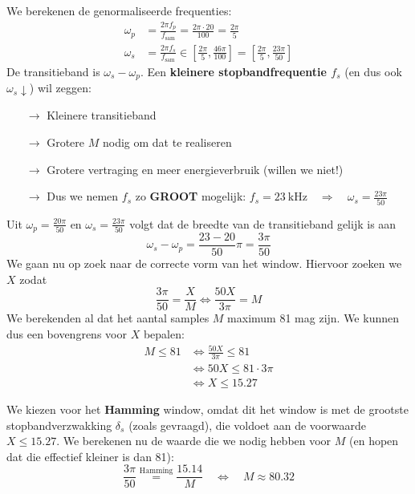 \documentclass[kulak]{kulakarticle}
\newcommand{\sam}{\text{sam}}
\begin{document}
	We berekenen de genormaliseerde frequenties:
	\begin{align*}
		\omega_p &= \frac{2\pi f_p}{f_\sam} = \frac{2\pi \cdot 20}{100} = \frac{2\pi}{5} \\
		\omega_s &= \frac{2\pi f_s}{f_\sam} \in \left[\frac{2\pi}{5},\frac{46\pi}{100}\right] = \left[\frac{2\pi}{5},\frac{23\pi}{50}\right]
	\end{align*}
	De transitieband is \(\omega_s-\omega_p\). Een \textbf{kleinere stopbandfrequentie \(f_s\)} (en dus ook \(\omega_s \downarrow\)) wil zeggen:
	\begin{itemize}
		\item[\(\rightarrow\)] Kleinere transitieband
		\item[\(\rightarrow\)] Grotere \(M\) nodig om dat te realiseren
		\item[\(\rightarrow\)] Grotere vertraging en meer energieverbruik (willen we niet!)
		\item[\(\rightarrow\)] Dus we nemen \(f_s\) zo \textbf{GROOT} mogelijk: \(f_s=\SI{23}{\kilo\hertz} \quad \Longrightarrow \quad \omega_s = \frac{23\pi}{50}\)
	\end{itemize}

	Uit \(\omega_p = \frac{20\pi}{50}\) en \(\omega_s = \frac{23\pi}{50}\) volgt dat de breedte van de transitieband gelijk is aan \[\omega_s-\omega_p=\frac{23-20}{50}\pi = \frac{3\pi}{50}\]	We gaan nu op zoek naar de correcte vorm van het window. Hiervoor zoeken we \(X\) zodat \[\frac{3\pi}{50}=\frac{X}{M} \Leftrightarrow \frac{50X}{3\pi}=M\] We berekenden al dat het aantal samples \(M\) maximum 81 mag zijn. We kunnen dus een bovengrens voor \(X\) bepalen:
	\begin{align*}
		M \leq 81 & \Leftrightarrow \frac{50X}{3\pi} \leq 81 \\
					& \Leftrightarrow 50X \leq 81 \cdot 3\pi \\
					& \Leftrightarrow X \leq 15.27
	\end{align*}

	We kiezen voor het \textbf{Hamming} window, omdat dit het window is met de grootste stopbandverzwakking \(\delta_s\) (zoals gevraagd), die voldoet aan de voorwaarde \(X \leq 15.27\). We berekenen nu de waarde die we nodig hebben voor \(M\) (en hopen dat die effectief kleiner is dan 81):
	\begin{equation*}
		\frac{3\pi}{50} \overset{\text{Hamming}}{=} \frac{15.14}{M} \quad \Leftrightarrow \quad M \approx 80.32
	\end{equation*}
\end{document}
